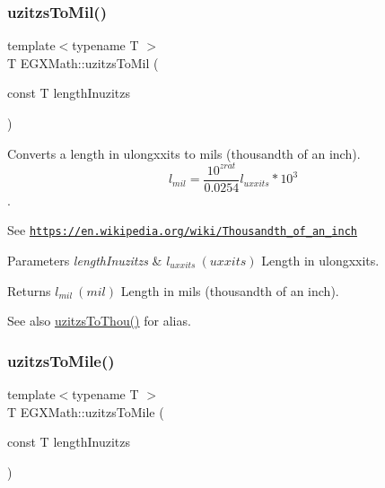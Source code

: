 \subsubsection{\texorpdfstring{uzitzs\+To\+Mil()}{uzitzsToMil()}}
{\footnotesize\ttfamily template$<$typename T $>$ \\
T E\+G\+X\+Math\+::uzitzs\+To\+Mil (\begin{DoxyParamCaption}\item[{const T}]{length\+Inuzitzs }\end{DoxyParamCaption})}



Converts a length in ulongxxits to mils (thousandth of an inch). \[ l_{mil}= \frac{10^{zrat}}{0.0254} l_{uxxits} * 10^{3} \]. 

See \href{https://en.wikipedia.org/wiki/Thousandth_of_an_inch}{\tt https\+://en.\+wikipedia.\+org/wiki/\+Thousandth\+\_\+of\+\_\+an\+\_\+inch} 
\begin{DoxyParams}{Parameters}
{\em length\+Inuzitzs} & $ l_{uxxits}\ (uxxits)$ Length in ulongxxits. \\
\hline
\end{DoxyParams}
\begin{DoxyReturn}{Returns}
$ l_{mil}\ (mil)$ Length in mils (thousandth of an inch). 
\end{DoxyReturn}
\begin{DoxySeeAlso}{See also}
\mbox{\hyperlink{group___e_g_x_math-_conversions-_length_conversions-_non-_s_i-uzitzs-_imperial_gaa11694f9026bf30e29bd716a35c05b4e}{uzitzs\+To\+Thou()}} for alias. 
\end{DoxySeeAlso}
\mbox{\label{group___e_g_x_math-_conversions-_length_conversions-_non-_s_i-uzitzs-_imperial_ga3396c913e6937eee49337db8fac05ca7}} 
\subsubsection{\texorpdfstring{uzitzs\+To\+Mile()}{uzitzsToMile()}}
{\footnotesize\ttfamily template$<$typename T $>$ \\
T E\+G\+X\+Math\+::uzitzs\+To\+Mile (\begin{DoxyParamCaption}\item[{const T}]{length\+Inuzitzs }\end{DoxyParamCaption})}



